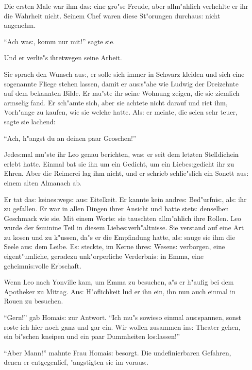 \documentclass[oneside,12pt]{book}
\newcommand{\s}{s:}%
\begin{document}
Die ersten Male war ihm da{\s} eine gro"se Freude, aber
allm"ahlich verhehlte er ihr die Wahrheit nicht. Seinem Chef waren
diese St"orungen durchau{\s} nicht angenehm.

"`Ach wa{\s}, komm nur mit!"' sagte sie.

Und er verlie"s ihretwegen seine Arbeit.

Sie sprach den Wunsch au{\s}, er solle sich immer in Schwarz
kleiden und sich eine sogenannte Fliege stehen lassen, damit er
au{\s}s"ahe wie Ludwig der Dreizehnte auf dem bekannten Bilde. Er
mu"ste ihr seine Wohnung zeigen, die sie ziemlich armselig fand.
Er sch"amte sich, aber sie achtete nicht darauf und riet ihm,
Vorh"ange zu kaufen, wie sie welche hatte. Al{\s} er meinte, die
seien sehr teuer, sagte sie lachend:

"`Ach, h"angst du an deinen paar Groschen!"'

Jede{\s}mal mu"ste ihr Leo genau berichten, wa{\s} er seit dem
letzten Stelldichein erlebt hatte. Einmal bat sie ihn um ein
Gedicht, um ein Liebe{\s}gedicht ihr zu Ehren. Aber die Reimerei
lag ihm nicht, und er schrieb schlie"slich ein Sonett au{\s} einem
alten Almanach ab.

Er tat da{\s} keine{\s}weg{\s} au{\s} Eitelkeit. Er kannte kein
andre{\s} Bed"urfni{\s}, al{\s} ihr zu gefallen. Er war in allen
Dingen ihrer Ansicht und hatte stet{\s} denselben Geschmack wie
sie. Mit einem Worte: sie tauschten allm"ahlich ihre Rollen. Leo
wurde der feminine Teil in diesem Liebe{\s}verh"altnisse. Sie
verstand auf eine Art zu kosen und zu k"ussen, da"s er die
Empfindung hatte, al{\s} sauge sie ihm die Seele au{\s} dem Leibe.
E{\s} steckte, im Kerne ihre{\s} Wesen{\s} verborgen, eine
eigent"umliche, geradezu unk"orperliche Verderbni{\s} in Emma,
eine geheimni{\s}volle Erbschaft.


\newpage\begin{center}
{\large \so{Se{ch}{st}e{\s} Kapitel}}\bigskip\bigskip
\end{center}

Wenn Leo nach Yonville kam, um Emma zu besuchen, a"s er h"aufig
bei dem Apotheker zu Mittag. Au{\s} H"oflichkeit lud er ihn ein,
ihn nun auch einmal in Rouen zu besuchen.

"`Gern!"' gab Homai{\s} zur Antwort. "`Ich mu"s sowieso einmal
au{\s}spannen, sonst roste ich hier noch ganz und gar ein. Wir
wollen zusammen in{\s} Theater gehen, ein bi"schen kneipen und ein
paar Dummheiten lo{\s}lassen!"'

"`Aber Mann!"' mahnte Frau Homai{\s} besorgt. Die undefinierbaren
Gefahren, denen er entgegenlief, "angstigten sie im vorau{\s}.
\end{document}
